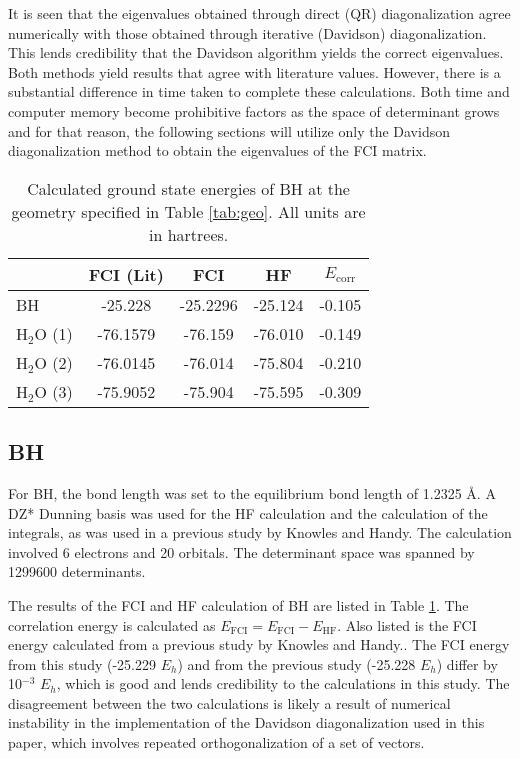 \documentclass[final,3p,times,twocolumn]{elsarticle}
\begin{document}
It is seen that the eigenvalues obtained through direct (QR) diagonalization agree numerically with those obtained through iterative (Davidson) diagonalization. This lends credibility that the Davidson algorithm yields the correct eigenvalues. Both methods yield results that agree with literature values. However, there is a substantial difference in time taken to complete these calculations. Both time and computer memory become prohibitive factors as the space of determinant grows and for that reason, the following sections will utilize only the Davidson diagonalization method to obtain the eigenvalues of the FCI matrix.


\begin{table}
\centering
\begin{tabular}{l|c|ccc} \hline\hline
& FCI (Lit) \cite{handy-1983} & FCI & HF & $E_{\text{corr}}$ \\ \hline
BH & -25.228 & -25.2296 &-25.124 & -0.105 \\ \hline
H$_2$O (1) & -76.1579 & -76.159 & -76.010 & -0.149 \\ 
H$_2$O (2) & -76.0145 & -76.014 & -75.804 & -0.210 \\
H$_2$O (3) & -75.9052 & -75.904 & -75.595 & -0.309 \\\hline\hline
\end{tabular}
\caption{Calculated ground state energies of BH at the geometry specified in Table \ref{tab:geo}. All units are in hartrees.}
\label{tab:results}
\end{table}
\subsection{BH} \label{sec:bhresults}

For BH, the bond length was set to the equilibrium bond length of 1.2325 \AA. A DZ* Dunning basis\cite{dunning} was used for the HF calculation and the calculation of the integrals, as was used in a previous study by Knowles and Handy.\cite{handy-1983} The calculation involved 6 electrons and 20 orbitals. The determinant space was spanned by 1299600 determinants.

The results of the FCI and HF calculation of BH are listed in Table \ref{tab:results}. The correlation energy is calculated as $E_{\text{FCI}} = E_{\text{FCI}} - E_{\text{HF}}$. Also listed is the FCI energy calculated from a previous study by Knowles and Handy.\cite{handy-1983}. The FCI energy from this study (-25.229 $E_h$) and from the previous study (-25.228 $E_h$) differ by 10$^{-3}$ $E_h$, which is good and lends credibility to the calculations in this study. The disagreement between the two calculations is likely a result of numerical instability in the implementation of the Davidson diagonalization used in this paper, which involves repeated orthogonalization of a set of vectors.
\end{document}
